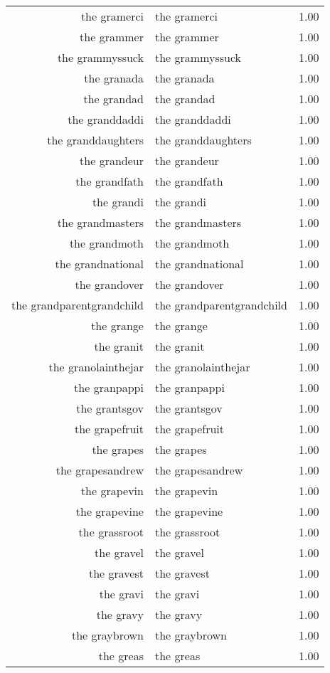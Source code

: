\begin{table}[ht]
\begin{tabular}{rlr}
  the gramerci & the gramerci & 1.00 \\ 
  the grammer & the grammer & 1.00 \\ 
  the grammyssuck & the grammyssuck & 1.00 \\ 
  the granada & the granada & 1.00 \\ 
  the grandad & the grandad & 1.00 \\ 
  the granddaddi & the granddaddi & 1.00 \\ 
  the granddaughters & the granddaughters & 1.00 \\ 
  the grandeur & the grandeur & 1.00 \\ 
  the grandfath & the grandfath & 1.00 \\ 
  the grandi & the grandi & 1.00 \\ 
  the grandmasters & the grandmasters & 1.00 \\ 
  the grandmoth & the grandmoth & 1.00 \\ 
  the grandnational & the grandnational & 1.00 \\ 
  the grandover & the grandover & 1.00 \\ 
  the grandparentgrandchild & the grandparentgrandchild & 1.00 \\ 
  the grange & the grange & 1.00 \\ 
  the granit & the granit & 1.00 \\ 
  the granolainthejar & the granolainthejar & 1.00 \\ 
  the granpappi & the granpappi & 1.00 \\ 
  the grantsgov & the grantsgov & 1.00 \\ 
  the grapefruit & the grapefruit & 1.00 \\ 
  the grapes & the grapes & 1.00 \\ 
  the grapesandrew & the grapesandrew & 1.00 \\ 
  the grapevin & the grapevin & 1.00 \\ 
  the grapevine & the grapevine & 1.00 \\ 
  the grassroot & the grassroot & 1.00 \\ 
  the gravel & the gravel & 1.00 \\ 
  the gravest & the gravest & 1.00 \\ 
  the gravi & the gravi & 1.00 \\ 
  the gravy & the gravy & 1.00 \\ 
  the graybrown & the graybrown & 1.00 \\ 
  the greas & the greas & 1.00 \\ 

\end{tabular}
\end{table}
